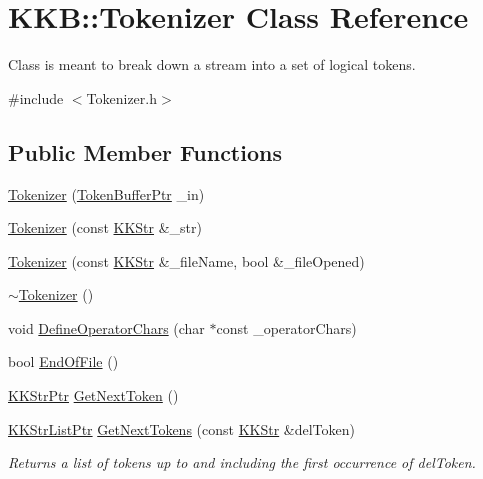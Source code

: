 \hypertarget{class_k_k_b_1_1_tokenizer}{}\section{K\+KB\+:\+:Tokenizer Class Reference}
\label{class_k_k_b_1_1_tokenizer}


Class is meant to break down a stream into a set of logical tokens.  




{\ttfamily \#include $<$Tokenizer.\+h$>$}

\subsection*{Public Member Functions}
\begin{DoxyCompactItemize}
\item 
\hyperlink{class_k_k_b_1_1_tokenizer_a6cb70351213d78ec1b36da76f447246e}{Tokenizer} (\hyperlink{namespace_k_k_b_ae97804d25124b4a5dba3b3637beb814a}{Token\+Buffer\+Ptr} \+\_\+in)
\item 
\hyperlink{class_k_k_b_1_1_tokenizer_a9ed287f03edb99625cdfc99ae61dd8ad}{Tokenizer} (const \hyperlink{class_k_k_b_1_1_k_k_str}{K\+K\+Str} \&\+\_\+str)
\item 
\hyperlink{class_k_k_b_1_1_tokenizer_ad134e856be2766eaff989fa2dcc862ca}{Tokenizer} (const \hyperlink{class_k_k_b_1_1_k_k_str}{K\+K\+Str} \&\+\_\+file\+Name, bool \&\+\_\+file\+Opened)
\item 
\hyperlink{class_k_k_b_1_1_tokenizer_a3f60f887953edf0f95ba5f36102f7017}{$\sim$\+Tokenizer} ()
\item 
void \hyperlink{class_k_k_b_1_1_tokenizer_a273eb0f0ad85cef3757866bf9957a52e}{Define\+Operator\+Chars} (char $\ast$const \+\_\+operator\+Chars)
\item 
bool \hyperlink{class_k_k_b_1_1_tokenizer_a0b04dca4dfbf584e58082cad41d0457b}{End\+Of\+File} ()
\item 
\hyperlink{namespace_k_k_b_a9adbef5a6b3be0867f5570df2a08f388}{K\+K\+Str\+Ptr} \hyperlink{class_k_k_b_1_1_tokenizer_aea0a06cf4683bcd6e1c3b42e76f9324f}{Get\+Next\+Token} ()
\item 
\hyperlink{namespace_k_k_b_a8f5f50672f37857425120831223888aa}{K\+K\+Str\+List\+Ptr} \hyperlink{class_k_k_b_1_1_tokenizer_a4b5e1c31228130d3308f6f0d7dbca6ce}{Get\+Next\+Tokens} (const \hyperlink{class_k_k_b_1_1_k_k_str}{K\+K\+Str} \&del\+Token)
\begin{DoxyCompactList}\small\item\em Returns a list of tokens up to and including the first occurrence of \textquotesingle{}del\+Token\textquotesingle{}. \end{DoxyCompactList}\item 

\end{DoxyCompactItemize}
